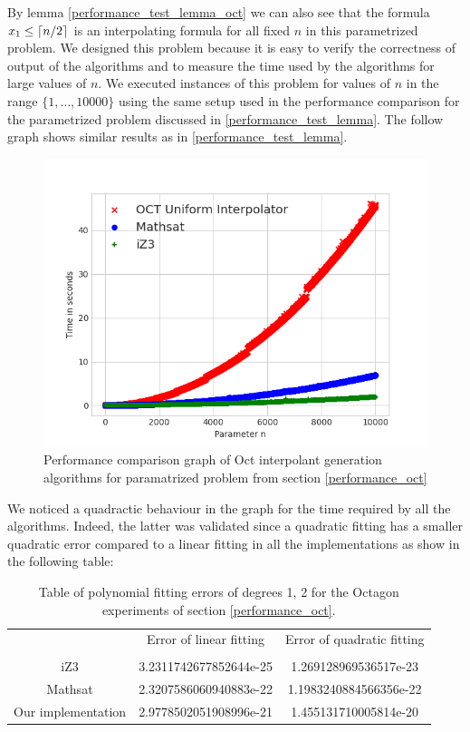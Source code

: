 By lemma \ref{performance_test_lemma_oct}
we can also see that the formula $x_1 \leq \lceil n/2\rceil$ is an 
interpolating formula for all fixed $n$ in this parametrized problem.
We designed this problem because it is easy to verify the 
correctness of output of the algorithms and to measure 
the time used by the algorithms for large values of $n$. 
We executed instances of this problem for values of $n$
in the range $\{1, \dots, 10000\}$ using the same setup 
used in the performance comparison for the parametrized 
problem discussed in \ref{performance_test_lemma}.
The follow graph shows similar results as 
in \ref{performance_test_lemma}.

\begin{figure}
  \centering
  \includegraphics[scale=0.9]{figures/octi_performance_graph}
  \caption{Performance comparison graph of Oct interpolant generation
  algorithms for paramatrized problem from section \ref{performance_oct}} 
  \label{performance_graph_euf}
\end{figure}

We noticed a quadractic behaviour in the graph for the time 
required by all the algorithms. Indeed, the latter was
validated since a quadratic fitting has a smaller quadratic
error compared to a linear fitting in all the implementations
as show in the following table:

\begin{table}[h]
  \centering
  \begin{tabular}{ccc}
    \toprule
    {}                 & Error of linear fitting & Error of quadratic fitting \\
    \cmidrule{2-2} \cmidrule{3-3} \\
    iZ3                & 3.2311742677852644e-25 & 1.269128969536517e-23       \\
    Mathsat            & 2.3207586060940883e-22 & 1.1983240884566356e-22      \\
    Our implementation & 2.9778502051908996e-21 & 1.455131710005814e-20       \\
    \bottomrule
  \end{tabular}
  \caption{Table of polynomial fitting errors of degrees 1, 2 for the
  Octagon experiments of section \ref{performance_oct}.}
\end{table}

